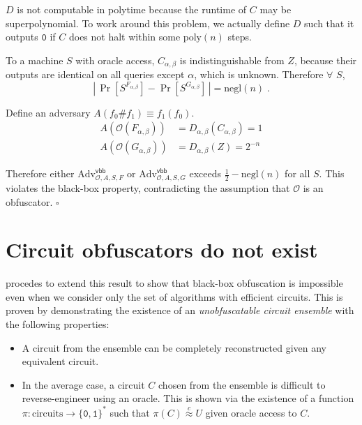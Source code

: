 \documentclass[10pt,twocolumn]{article}
\newcommand{\abs}[1]{{\ensuremath{\left\vert\,#1\,\right\vert}}}
\def\zero{\texttt{0}}
\def\one{\texttt{1}}
\def\bit{{\ensuremath{\{\zero,\one\}}}}
\def\obf{\ensuremath{\mathcal{O}}}
\def\negl{\text{negl}}
\def\poly{\text{poly}}
\def\cind{{\ensuremath{\stackrel{c}{\approx}}}}
\def\Adv{\text{Adv}}
\def\qed{\hfill \ensuremath{\square}}
\def\vbb{\textsf{vbb}}
\begin{document}
    $D$ is not computable in polytime because the runtime of $C$ may be superpolynomial.
    To work around this problem, we actually define $D$ such that it outputs $\zero$ if $C$
    does not halt within some $\poly(n)$ steps.

    To a machine $S$ with oracle access, $C_{\alpha,\beta}$ is indistinguishable from $Z$,
    because their outputs are identical on all queries except $\alpha$, which is unknown.
    Therefore $\forall$ $S$,
    \[ \abs{\Pr[S^{F_{\alpha,\beta}}] - \Pr[S^{G_{\alpha,\beta}}]} = \negl(n) \;. \]

    Define an adversary $A(f_0\#f_1) \equiv f_1(f_0)$.
    \begin{align*}
      A(\obf(F_{\alpha,\beta})) & = D_{\alpha,\beta}(C_{\alpha,\beta}) = 1\\
      A(\obf(G_{\alpha,\beta})) & = D_{\alpha,\beta}(Z) = 2^{-n}
    \end{align*}

    Therefore either $\Adv^\vbb_{\obf,A,S,F}$ or $\Adv^\vbb_{\obf,A,S,G}$
    exceeds $\frac{1}{2}-\negl(n)$ for all $S$.
    This violates the black-box property, contradicting the assumption that $\obf$ is an obfuscator. \qed

    \section{Circuit obfuscators do not exist}

    \cite{onThe(Im)possibility} procedes to extend this result to show that black-box obfuscation is
    impossible even when we consider only the set of algorithms with efficient circuits.
    This is proven by demonstrating the existence of an \textit{unobfuscatable circuit ensemble}
    with the following properties:%

    \begin{itemize}

      \item
        A circuit from the ensemble can be completely reconstructed given any equivalent circuit.

      \item
        In the average case, a circuit $C$ chosen from the ensemble is difficult to reverse-engineer using an oracle.
        This is shown via the existence of a function $\pi: \text{circuits}\to\bit^*$ such that $\pi(C)\cind U$
        given oracle access to $C$.

    \end{itemize}
\end{document}
